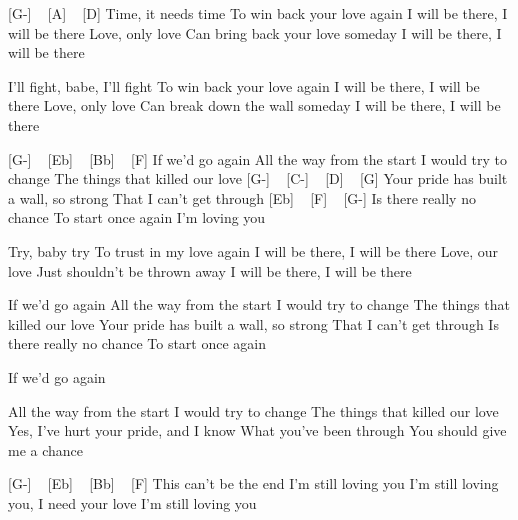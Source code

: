 
[G-] ~ [A] ~ [D]
Time, it needs time
To win back your love again
I will be there, I will be there
Love, only love
Can bring back your love someday
I will be there, I will be there

I'll fight, babe, I'll fight
To win back your love again
I will be there, I will be there
Love, only love
Can break down the wall someday
I will be there, I will be there

[G-] ~ [Eb] ~ [Bb] ~ [F]
If we'd go again
All the way from the start
I would try to change
The things that killed our love
[G-] ~ [C-] ~ [D] ~ [G]
Your pride has built a wall, so strong
That I can't get through
[Eb] ~ [F] ~ [G-]
Is there really no chance
To start once again
I'm loving you


Try, baby try
To trust in my love again
I will be there, I will be there
Love, our love
Just shouldn't be thrown away
I will be there, I will be there

If we'd go again
All the way from the start
I would try to change
The things that killed our love
Your pride has built a wall, so strong
That I can't get through
Is there really no chance
To start once again

If we'd go again

All the way from the start
I would try to change
The things that killed our love
Yes, I've hurt your pride, and I know
What you've been through
You should give me a chance

[G-] ~ [Eb] ~ [Bb] ~ [F]
This can't be the end
I'm still loving you
I'm still loving you, I need your love
I'm still loving you 